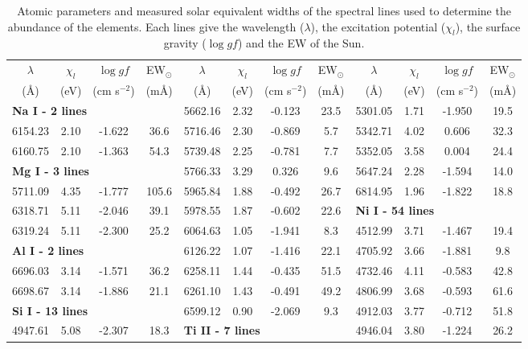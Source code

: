\documentclass[dvips,12pt,a4paper]{report}
\begin{document}
{{\begin{table}[h!]\tiny
\centering
\caption[Atomic parameters of the spectral lines]{Atomic parameters and measured solar equivalent widths of the spectral lines used to determine the abundance of the elements. Each lines give the wavelength ($\lambda$), the excitation potential ($\chi_l$), the surface gravity ($\log gf$) and the EW of the Sun.}
\label {loggf}
  \begin{tabular}{c c c c | c c c c | c c c c}
\hline
\hline 
$\lambda$ & $\chi_l$ & $\log gf$ & EW$_\odot$  &$\lambda $ & $\chi_l$ & $\log gf$ & EW$_\odot$ &$\lambda $ & $\chi_l$ & $\log gf$ & EW$_\odot$ \\
(\AA) & (eV) & (cm s$^{-2}$) & (m\AA{}) & (\AA) & (eV) & (cm s$^{-2}$) & (m\AA{}) & (\AA) & (eV) & (cm s$^{-2}$) & (m\AA{}) \\
\hline
\multicolumn{3}{l}{\textbf{Na I - 2 lines}} &  & 5662.16 & 2.32 & -0.123 &  23.5 & 5301.05 & 1.71 & -1.950 &  19.5 \\
6154.23 & 2.10 & -1.622 &  36.6 & 5716.46 & 2.30 & -0.869 &   5.7 & 5342.71 & 4.02 &  0.606 &  32.3 \\
6160.75 & 2.10 & -1.363 &  54.3 & 5739.48 & 2.25 & -0.781 &   7.7 & 5352.05 & 3.58 &  0.004 &  24.4 \\
\multicolumn{3}{l}{\textbf{Mg I - 3 lines}} &  & 5766.33 & 3.29 &  0.326 &   9.6 & 5647.24 & 2.28 & -1.594 &  14.0 \\
5711.09 & 4.35 & -1.777 & 105.6 & 5965.84 & 1.88 & -0.492 &  26.7 & 6814.95 & 1.96 & -1.822 &  18.8 \\
6318.71 & 5.11 & -2.046 &  39.1 & 5978.55 & 1.87 & -0.602 &  22.6 & \multicolumn{3}{l}{\textbf{Ni I - 54 lines}} &  \\
6319.24 & 5.11 & -2.300 &  25.2 & 6064.63 & 1.05 & -1.941 &   8.3 & 4512.99 & 3.71 & -1.467 &  19.4 \\
\multicolumn{3}{l}{\textbf{Al I - 2 lines}} &  & 6126.22 & 1.07 & -1.416 &  22.1 & 4705.92 & 3.66 & -1.881 &   9.8 \\
6696.03 & 3.14 & -1.571 &  36.2 & 6258.11 & 1.44 & -0.435 &  51.5 & 4732.46 & 4.11 & -0.583 &  42.8 \\
6698.67 & 3.14 & -1.886 &  21.1 & 6261.10 & 1.43 & -0.491 &  49.2 & 4806.99 & 3.68 & -0.593 &  61.6 \\
\multicolumn{3}{l}{\textbf{Si I - 13 lines}} & & 6599.12 & 0.90 & -2.069 &   9.3 & 4912.03 & 3.77 & -0.712 &  51.8 \\
4947.61 & 5.08 & -2.307 &  18.3 & \multicolumn{3}{l}{\textbf{Ti II - 7 lines}} & &  4946.04 & 3.80 & -1.224 &  26.2 \\

\end{tabular}
\end{table}}}
\end{document}
